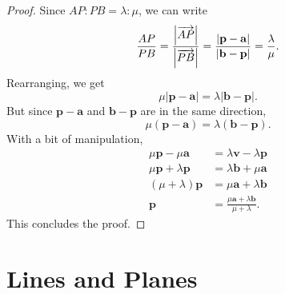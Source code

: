 \documentclass[12pt]{article}
\renewcommand{\vec}{\mathbf}
\begin{document}
\begin{proof}
	Since \(AP : PB = \lambda : \mu\), we can write
	\[ \frac{AP}{PB} = \frac{\abs*{\overrightarrow{AP}}}{\abs*{\overrightarrow{PB}}} = \frac{\abs{\vec{p} - \vec{a}}}{\abs{\vec{b} - \vec{p}}} = \frac{\lambda}{\mu}. \] 
	Rearranging, we get 
	\[ \mu|\vec{p} - \vec{a}| = \lambda |\vec{b} - \vec{p}|. \] 
	But since \(\vec{p} - \vec{a}\) and \(\vec{b} - \vec{p}\) are in the same direction, 
	\[ \mu(\vec{p} - \vec{a}) = \lambda (\vec{b} - \vec{p}). \]
	With a bit of manipulation,
	\begin{align*}
		\mu \vec{p} - \mu \vec{a} &= \lambda \vec{v} - \lambda \vec{p} \\
		\mu \vec{p} + \lambda \vec{p} &= \lambda \vec{b} + \mu \vec{a} \\
		(\mu + \lambda) \vec{p} &= \mu \vec{a} + \lambda \vec{b} \\
		\vec{p} &= \frac{\mu \vec{a} + \lambda \vec{b}}{\mu + \lambda}.
	\end{align*}
	This concludes the proof.
\end{proof}

\section{Lines and Planes}
\end{document}
